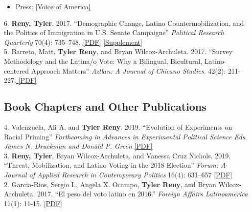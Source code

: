 \documentclass[11pt, a4paper]{article}
\newcommand{\years}[1]{\marginnote{\scriptsize #1}}
\begin{document}
\begin{itemize}
\item Press: \href{https://www.voanews.com/a/immigrants-candidates-make-a-run-for-it-in-upcoming-us-elections/4439132.html}{[Voice of America]}
\end{itemize}

\years{2017} 6. \textbf{Reny, Tyler}. 2017. ``Demographic Change, Latino Countermobilization, and the Politics of Immigration in U.S. Senate Campaigns'' \textit{Political Research Quarterly} 70(4): 735–748. \href{http://tylerreny.github.io/pdf/pubs/reny_2017_prq_final.pdf}{[PDF]} \href{http://tylerreny.github.io/pdf/pubs/reny_2017_prq_final_supp.pdf}{[Supplement]}\\

\years{} 5. Barreto, Matt, \textbf{Tyler Reny}, and Bryan Wilcox-Archuleta. 2017. ``Survey Methodology and the Latina/o Vote: Why a Bilingual, Bicultural, Latino-centered Approach Matters'' \textit{Aztl$\acute{a}$n: A Journal of Chicano Studies.} 42(2): 211-227.\href{http://tylerreny.github.io/pdf/pubs/reny_2017_aztlan_final.pdf}{ [PDF]}\\

\subsection*{Book Chapters and Other Publications}

\years{2019} 4. Valenzuela, Ali A. and \textbf{Tyler Reny}. 2019. ``Evolution of Experiments on Racial Priming''  \textit{Forthcoming in Advances in Experimental Political Science Eds. James N. Druckman and Donald P. Green} \href{http://tylerreny.github.io/pdf/pubs/ValenzuelaReny_racial_priming_cambridge_handbook.pdf}{[PDF]}\\

\years{} 3. \textbf{Reny, Tyler}, Bryan Wilcox-Archuleta, and Vanessa Cruz Nichols. 2019. ``Threat, Mobilization, and Latino Voting in the 2018 Election''  \textit{Forum: A Journal of Applied Research in Contemporary Politics} 16(4): 631–657 \href{http://tylerreny.github.io/pdf/pubs/reny_wilcox_cruz_nichols2019.pdf}{[PDF]} \\

\years{2017} 2. Garcia-Rios, Sergio I., Angela X. Ocampo, \textbf{Tyler Reny}, and Bryan Wilcox-Archuleta. 2017. ``El peso del voto latino en 2016.'' \textit{Foreign Affairs Latinoamerica} 17(1): 11-15. \href{http://tylerreny.github.io/pdf/pubs/reny_et_al_2017_foreign_affairs.pdf}{ [PDF]}\\
\end{document}
